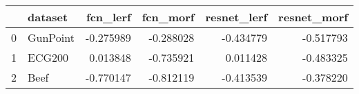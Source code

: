 \begin{tabular}{llrrrr}
\toprule
{} &   dataset &  fcn\_lerf &  fcn\_morf &  resnet\_lerf &  resnet\_morf \\
\midrule
0 &  GunPoint & -0.275989 & -0.288028 &    -0.434779 &    -0.517793 \\
1 &    ECG200 &  0.013848 & -0.735921 &     0.011428 &    -0.483325 \\
2 &      Beef & -0.770147 & -0.812119 &    -0.413539 &    -0.378220 \\
\bottomrule
\end{tabular}
